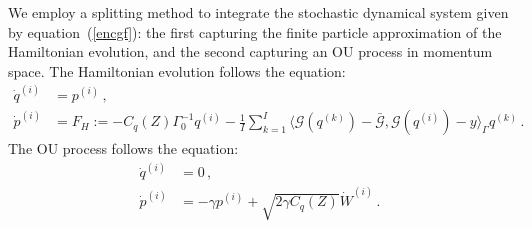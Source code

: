 \documentclass[12pt]{caltech_thesis}
\numberwithin{equation}{section}
\begin{document}
We employ a splitting method to integrate the stochastic {dynamical} system
given by equation~(\ref{encgf}): {the first capturing the finite
particle approximation of the Hamiltonian evolution,} 
and the second capturing an OU process in momentum space.  
{The Hamiltonian evolution follows the equation}:
\begin{equation}\label{exp:Ham}
\begin{aligned}
\dot{q}^{(i)}&= p^{(i)}\,,  \\
\dot{p}^{(i)}&= F_{H}:= -C_q(Z)\Gamma_0^{-1} {q}^{(i)}
-\frac{1}{I} \sum_{k=1}^{I}\langle  \mathcal{G}(q^{(k)})-\bar{\mathcal{G}}, \mathcal{G}(q^{(i)})-y\rangle_{\Gamma} q^{(k)}\,.
\end{aligned}
\end{equation}
The OU process follows the equation:
\begin{equation}\label{exp:OU}
\begin{aligned}
\dot{q}^{(i)}&= 0\,,  \\
\dot{p}^{(i)}&=-\gamma p^{(i)} +\sqrt{2\gamma C_q(Z)} \dot{W}^{(i)}\,.
\end{aligned}
\end{equation}  
\end{document}
